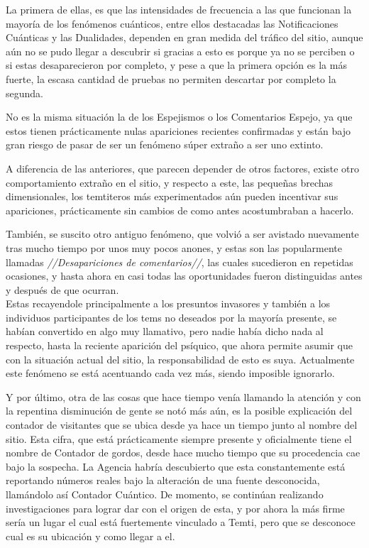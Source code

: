 \documentclass[
  spanish,
]{book}
\begin{document}
La primera de ellas, es que las intensidades de frecuencia a las que funcionan la mayoría de los fenómenos cuánticos, entre ellos destacadas las Notificaciones Cuánticas y las Dualidades, dependen en gran medida del tráfico del sitio, aunque aún no se pudo llegar a descubrir si gracias a esto es porque ya no se perciben o si estas desaparecieron por completo, y pese a que la primera opción es la más fuerte, la escasa cantidad de pruebas no permiten descartar por completo la segunda.

No es la misma situación la de los Espejismos o los Comentarios Espejo, ya que estos tienen prácticamente nulas apariciones recientes confirmadas y están bajo gran riesgo de pasar de ser un fenómeno súper extraño a ser uno extinto.

A diferencia de las anteriores, que parecen depender de otros factores, existe otro comportamiento extraño en el sitio, y respecto a este, las pequeñas brechas dimensionales, los temtiteros más experimentados aún pueden incentivar sus apariciones, prácticamente sin cambios de como antes acostumbraban a hacerlo.

También, se suscito otro antiguo fenómeno, que volvió a ser avistado nuevamente tras mucho tiempo por unos muy pocos anones, y estas son las popularmente llamadas \emph{//Desapariciones de comentarios//}, las cuales sucedieron en repetidas ocasiones, y hasta ahora en casi todas las oportunidades fueron distinguidas antes y después de que ocurran.\\
Estas recayendole principalmente a los presuntos invasores y también a los individuos participantes de los tems no deseados por la mayoría presente, se habían convertido en algo muy llamativo, pero nadie había dicho nada al respecto, hasta la reciente aparición del psíquico, que ahora permite asumir que con la situación actual del sitio, la responsabilidad de esto es suya. Actualmente este fenómeno se está acentuando cada vez más, siendo imposible ignorarlo.

Y por último, otra de las cosas que hace tiempo venía llamando la atención y con la repentina disminución de gente se notó más aún, es la posible explicación del contador de visitantes que se ubica desde ya hace un tiempo junto al nombre del sitio. Esta cifra, que está prácticamente siempre presente y oficialmente tiene el nombre de Contador de gordos, desde hace mucho tiempo que su procedencia cae bajo la sospecha. La Agencia habría descubierto que esta constantemente está reportando números reales bajo la alteración de una fuente desconocida, llamándolo así Contador Cuántico. De momento, se continúan realizando investigaciones para lograr dar con el origen de esta, y por ahora la más firme sería un lugar el cual está fuertemente vinculado a Temti, pero que se desconoce cual es su ubicación y como llegar a el.
\end{document}
